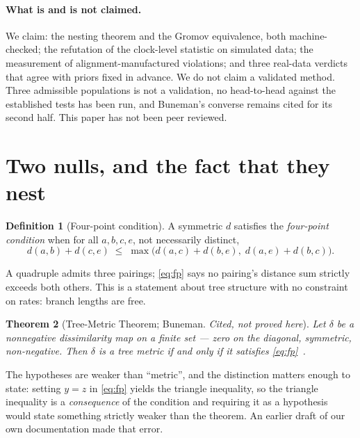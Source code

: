 \documentclass[11pt,a4paper]{article}
\newtheorem{theorem}{Theorem}[section]
\theoremstyle{definition}
\newtheorem{definition}[theorem]{Definition}
\theoremstyle{remark}
\begin{document}
\paragraph{What is and is not claimed.} We claim: the nesting theorem and the
Gromov equivalence, both machine-checked; the refutation of the clock-level
statistic on simulated data; the measurement of alignment-manufactured
violations; and three real-data verdicts that agree with priors fixed in advance.
We do not claim a validated method. Three admissible populations is not a
validation, no head-to-head against the established tests has been run, and
Buneman's converse remains cited for its second half. This paper has not been
peer reviewed.

\section{Two nulls, and the fact that they nest}\label{sec:nulls}

\begin{definition}[Four-point condition]\label{def:fp}
A symmetric $d$ satisfies the \emph{four-point condition} when for all
$a,b,c,e$, not necessarily distinct,
\begin{equation}\label{eq:fp}
  d(a,b) + d(c,e) \;\le\;
  \max\!\big(d(a,c)+d(b,e),\; d(a,e)+d(b,c)\big).
\end{equation}
\end{definition}

A quadruple admits three pairings; \eqref{eq:fp} says no pairing's distance sum
strictly exceeds both others. This is a statement about tree structure with no
constraint on rates: branch lengths are free.

\begin{theorem}[Tree-Metric Theorem; Buneman. \emph{Cited, not proved here}]\label{thm:buneman}
Let $\delta$ be a nonnegative dissimilarity map on a finite set --- zero on the
diagonal, symmetric, non-negative. Then $\delta$ is a tree metric if and only if
it satisfies \eqref{eq:fp}~\cite{buneman,semplesteel}.
\end{theorem}

The hypotheses are weaker than ``metric'', and the distinction matters enough to
state: setting $y = z$ in \eqref{eq:fp} yields the triangle inequality, so the
triangle inequality is a \emph{consequence} of the condition and requiring it as
a hypothesis would state something strictly weaker than the theorem. An earlier
draft of our own documentation made that error.
\end{document}
